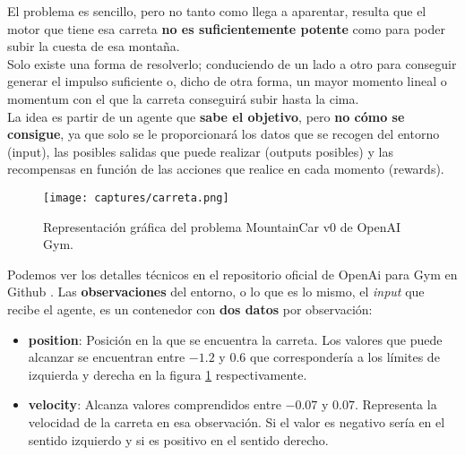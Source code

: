 \documentclass[11pt,fleqn]{book} %
\begin{document}
El problema es sencillo, pero no tanto como llega a aparentar, resulta que el motor que tiene esa carreta \textbf{no es suficientemente potente} como para poder subir la cuesta de esa montaña. \\

Solo existe una forma de resolverlo; conduciendo de un lado a otro para conseguir generar el impulso suficiente o, dicho de otra forma, un mayor momento lineal o momentum con el que la carreta conseguirá subir hasta la cima. \\

La idea es partir de un agente que \textbf{sabe el objetivo}, pero \textbf{no cómo se consigue}, ya que solo se le proporcionará los datos que se recogen del entorno (input), las posibles salidas que puede realizar (outputs posibles) y las recompensas en función de las acciones que realice en cada momento (rewards). \\

\begin{figure}[H]
	\centering\texttt{[image: captures/carreta.png]}
	\caption{Representación gráfica del problema MountainCar v0 de OpenAI Gym.}
	\label{fig:carreta} %
\end{figure}

Podemos ver los detalles técnicos en el repositorio oficial de OpenAi para Gym en Github \cite{article:mountain2}. Las \textbf{observaciones} del entorno, o lo que es lo mismo, el \textit{input} que recibe el agente, es un contenedor con \textbf{dos datos} por observación: \\

\begin{itemize}
	\item \textbf{position}: Posición en la que se encuentra la carreta. Los valores que puede alcanzar se encuentran entre $-1.2$ y $0.6$ que correspondería a los límites de izquierda y derecha en la figura \ref{fig:carreta} respectivamente. \\
	
	\item \textbf{velocity}: Alcanza valores comprendidos entre $-0.07$ y $0.07$. Representa la velocidad de la carreta en esa observación. Si el valor es negativo sería en el sentido izquierdo y si es positivo en el sentido derecho. \\
\end{itemize}
\end{document}
